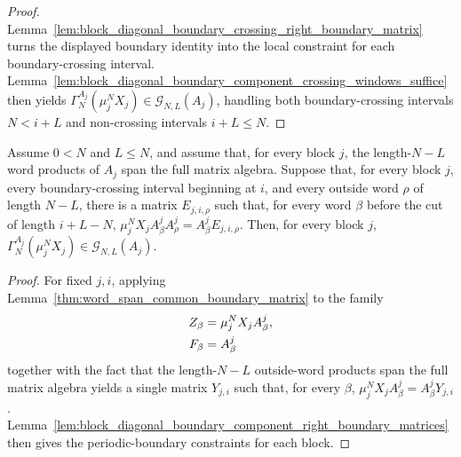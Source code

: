\begin{proof}
    \leanok
    Lemma~\ref{lem:block_diagonal_boundary_crossing_right_boundary_matrix}
    turns the displayed boundary identity into the local constraint for each
    boundary-crossing interval.
    Lemma~\ref{lem:block_diagonal_boundary_component_crossing_windows_suffice}
    then yields
    $\Gamma_N^{A_j}(\mu_j^NX_j) \in \mathcal G_{N,L}(A_j)$,
    handling both boundary-crossing intervals $N<i+L$ and non-crossing
    intervals $i+L\le N$.
\end{proof}

\begin{lemma}
    \label{lem:block_diagonal_boundary_component_complementary_word_identities}
    \leanok
    Assume $0<N$ and $L\le N$, and assume that, for every block $j$, the
    length-$N-L$ word products of $A_j$ span the full matrix algebra. Suppose
    that, for every block $j$, every boundary-crossing interval beginning at
    $i$, and every outside word $\rho$ of length $N-L$, there is a matrix
    $E_{j,i,\rho}$ such that, for every word $\beta$ before the cut of length
    $i+L-N$,
    $\mu_j^N X_j A^j_\beta A^j_\rho = A^j_\beta E_{j,i,\rho}$.
    Then, for every block $j$,
    $\Gamma_N^{A_j}(\mu_j^NX_j) \in \mathcal G_{N,L}(A_j)$.
\end{lemma}

\begin{proof}
    \leanok
    For fixed $j,i$, applying
    Lemma~\ref{thm:word_span_common_boundary_matrix} to the family
    \begin{align}
        Z_\beta
         & =
        \mu_j^NX_jA^j_\beta,
        \notag \\
        F_\beta
         & =
        A^j_\beta
        \notag
    \end{align}
    together with the fact that the length-$N-L$ outside-word products span the
    full matrix algebra yields a single matrix $Y_{j,i}$ such that, for every
    $\beta$,
    $\mu_j^NX_jA^j_\beta = A^j_\beta Y_{j,i}$.
    Lemma~\ref{lem:block_diagonal_boundary_component_right_boundary_matrices}
    then gives the periodic-boundary constraints for each block.
\end{proof}

